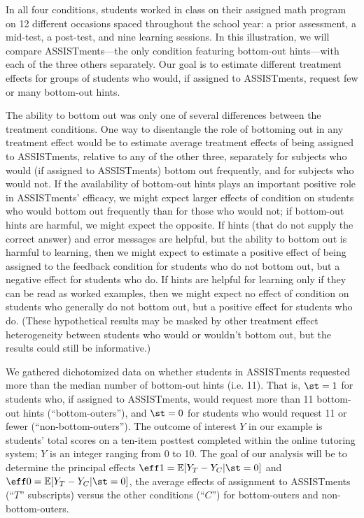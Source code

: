 \documentclass[]{article}
\begin{document}
In all four conditions, students worked in class on their assigned math program on 12 different occasions spaced throughout the school year: a prior assessment, a mid-test, a post-test, and nine learning sessions.
In this illustration, we will compare ASSISTments---the only condition featuring bottom-out hints---with each of the three others separately. Our goal is to estimate different treatment effects for groups of students who would, if assigned to ASSISTments, request few or many bottom-out hints.

The ability to bottom out was only one of several differences between the treatment conditions. One way to disentangle the role of bottoming out in any treatment effect would be to estimate average treatment effects of being assigned to ASSISTments, relative to any of the other three, separately for subjects who would (if assigned to ASSISTments) bottom out frequently, and for subjects who would not.
If the availability of bottom-out hints plays an important positive role in ASSISTments' efficacy, we might expect larger effects of condition on students who would bottom out frequently than for those who would not; if bottom-out hints are harmful, we might expect the opposite.
If hints (that do not supply the correct answer) and error messages are helpful, but the ability to bottom out is harmful to learning, then we might expect to estimate a positive effect of being assigned to the feedback condition for students who do not bottom out, but a negative effect for students who do. If hints are helpful for learning only if they can be read as worked examples, then we might expect no effect of condition on students who generally do not bottom out, but a positive effect for students who do.
(These hypothetical results may be masked by other treatment effect heterogeneity between students who would or wouldn't bottom out, but the results could still be informative.)

\sloppy
We gathered dichotomized data on %
whether students in ASSISTments requested more than the median number of bottom-out hints (i.e. 11).
That is, $\st=1$ for students who, if assigned to ASSISTments, would request more than 11 bottom-out hints (``bottom-outers''), and $\st=0$ for students who would request 11 or fewer (``non-bottom-outers''). %
The outcome of interest $Y$ in our example is students' total scores on a ten-item posttest completed within the online tutoring system; $Y$ is an integer ranging from 0 to 10.
The goal of our analysis will be to determine the principal effects $\eff1=\EE[\yt-\yc|\st=0]$ and $\eff0=\EE[\yt-\yc|\st=0]$, the average effects of assignment to ASSISTments (``$T$'' subscripts) versus the other conditions (``$C$'') for bottom-outers and non-bottom-outers.
\end{document}
